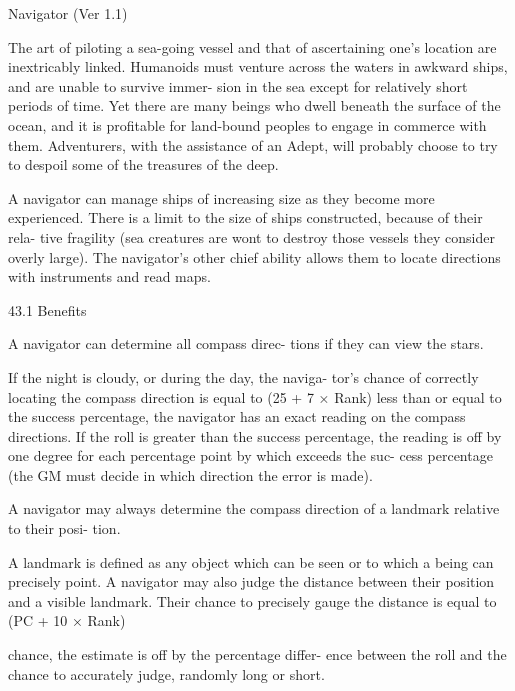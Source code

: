 \begin{Chapter}{Navigator (Ver 1.1)}

The  art  of  piloting  a  sea-going  vessel  and  that  of 
ascertaining  one’s  location  are  inextricably  linked. 
Humanoids  must  venture  across  the  waters  in 
awkward  ships,  and  are  unable  to  survive  immer-
sion in the sea except for relatively short periods of 
time. Yet there are many beings who dwell beneath 
the  surface  of  the  ocean,  and  it  is  profitable  for 
land-bound  peoples  to  engage  in  commerce  with 
them. Adventurers, with the assistance of an Adept, 
will  probably  choose  to  try  to  despoil  some  of  the 
treasures of the deep. 

A navigator can manage ships of increasing size as 
they become more  experienced. There is a limit to 
the size of ships constructed, because of their rela-
tive  fragility  (sea  creatures  are  wont  to  destroy 
those  vessels  they  consider  overly  large).  The 
navigator’s other chief ability allows them to locate 
directions with instruments and read maps. 

43.1 Benefits 

A  navigator  can  determine  all  compass  direc-
tions if they can view the stars. 

If the night is cloudy, or during the day, the naviga-
tor’s  chance  of  correctly  locating  the  compass 
direction is equal to (25 + 7 × Rank)%
less  than  or  equal  to  the  success  percentage,  the 
navigator  has  an  exact  reading  on  the  compass 
directions.  If  the  roll  is  greater  than  the  success 
percentage,  the  reading  is  off  by  one  degree  for 
each  percentage  point  by  which  exceeds  the  suc-
cess  percentage  (the  GM  must  decide  in  which 
direction the error is made). 

A navigator may always determine the compass 
direction  of  a  landmark  relative  to  their  posi-
tion. 

A  landmark is defined as any object which can be 
seen  or  to  which  a  being  can  precisely  point.  A 
navigator  may  also  judge  the  distance  between 
their position and a visible landmark. Their chance 
to precisely gauge the distance is equal to (PC + 10 
×  Rank)%

chance, the estimate is off by the percentage differ-
ence between the roll and the chance to accurately 
judge, randomly long or short. 


\end{Chapter}
